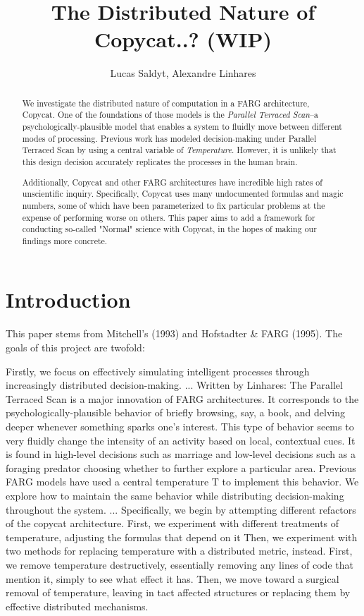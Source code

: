 \documentclass[a4paper]{article}
\title{The Distributed Nature of Copycat..? (WIP)}
\author{Lucas Saldyt, Alexandre Linhares}
\begin{document}
\maketitle

\begin{abstract}
    We investigate the distributed nature of computation in a FARG architecture, Copycat. 
    One of the foundations of those models is the \emph{Parallel Terraced Scan}--a psychologically-plausible model that enables a system to fluidly move between different modes of processing.  
    Previous work has modeled decision-making under Parallel Terraced Scan by using a central variable of \emph{Temperature}. 
    However, it is unlikely that this design decision accurately replicates the processes in the human brain.

    Additionally, Copycat and other FARG architectures have incredible high rates of unscientific inquiry.
    Specifically, Copycat uses many undocumented formulas and magic numbers, some of which have been parameterized to fix particular problems at the expense of performing worse on others.
    This paper aims to add a framework for conducting so-called "Normal" science with Copycat, in the hopes of making our findings more concrete.

\end{abstract}

\section{Introduction}

    This paper stems from Mitchell's (1993) and Hofstadter \& FARG (1995). The goals of this project are twofold:

    Firstly, we focus on effectively simulating intelligent processes through increasingly distributed decision-making.
    ...
    Written by Linhares:
    The Parallel Terraced Scan is a major innovation of FARG architectures. 
    It corresponds to the psychologically-plausible behavior of briefly browsing, say, a book, and delving deeper whenever something sparks one's interest. 
    This type of behavior seems to very fluidly change the intensity of an activity based on local, contextual cues. 
    It is found in high-level decisions such as marriage and low-level decisions such as a foraging predator choosing whether to further explore a particular area. 
    Previous FARG models have used a central temperature T to implement this behavior. 
    We explore how to maintain the same behavior while distributing decision-making throughout the system.
    ...
    Specifically, we begin by attempting different refactors of the copycat architecture.
    First, we experiment with different treatments of temperature, adjusting the formulas that depend on it
    Then, we experiment with two methods for replacing temperature with a distributed metric, instead.
    First, we remove temperature destructively, essentially removing any lines of code that mention it, simply to see what effect it has.
    Then, we move toward a surgical removal of temperature, leaving in tact affected structures or replacing them by effective distributed mechanisms.
\end{document}
